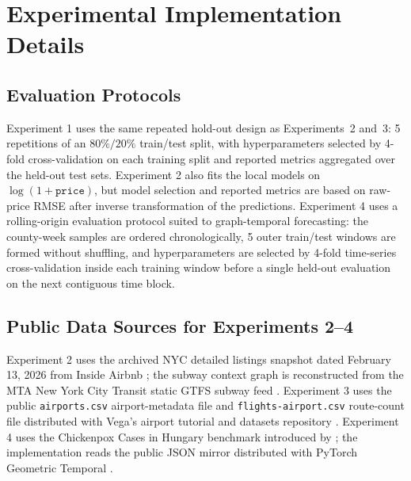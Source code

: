 \documentclass[final,1p,times,authoryear]{elsarticle}
\begin{document}
\section{Experimental Implementation Details}
\label{app:exp_details}

\subsection{Evaluation Protocols}
Experiment 1 uses the same repeated hold-out design as Experiments~2 and~3: 5 repetitions of an \(80\%/20\%\) train/test split, with hyperparameters selected by 4-fold cross-validation on each training split and reported metrics aggregated over the held-out test sets. Experiment 2 also fits the local models on \(\log(1+\texttt{price})\), but model selection and reported metrics are based on raw-price RMSE after inverse transformation of the predictions. Experiment 4 uses a rolling-origin evaluation protocol suited to graph-temporal forecasting: the county-week samples are ordered chronologically, 5 outer train/test windows are formed without shuffling, and hyperparameters are selected by 4-fold time-series cross-validation inside each training window before a single held-out evaluation on the next contiguous time block.

\subsection{Public Data Sources for Experiments 2--4}
Experiment 2 uses the archived NYC detailed listings snapshot dated February 13, 2026 from Inside Airbnb \citep{insideairbnb2026nyc}; the subway context graph is reconstructed from the MTA New York City Transit static GTFS subway feed \citep{mta_gtfs_subway_2026}. Experiment 3 uses the public \texttt{airports.csv} airport-metadata file and \texttt{flights-airport.csv} route-count file distributed with Vega's airport tutorial and datasets repository \citep{vega_airports_2026,vega_flights_airport_2026}. Experiment 4 uses the Chickenpox Cases in Hungary benchmark introduced by \citet{rozemberczki2021chickenpox}; the implementation reads the public JSON mirror distributed with PyTorch Geometric Temporal \citep{pyg_temporal_chickenpox_2026}.
\end{document}
